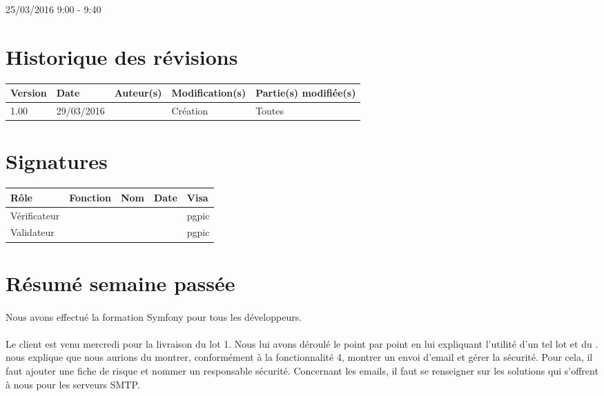\documentclass [a4paper] {article}
\begin{document}
25/03/2016			 				%
\hfill   
\hfill 	 9:00 - 9:40 				%


\section*{Historique des révisions}
\begin{center}
			\begin{tabular}{| p{2.5cm} | p{3cm} | p{3cm} | p{3cm} | p{3.5cm} |}
				\hline
				\rowcolor{Gray}
				Version & Date & Auteur(s) & Modification(s) & Partie(s) modifiée(s)		 \\
				\hline
				1.00 & 29/03/2016 & \Pierre & Création & Toutes \\
		\hline		
			\end{tabular}
		\end{center}

\section*{Signatures}

		\begin{center}
			\begin{tabular}{| p{2.5cm} | p{4cm} | p{3cm} | p{3cm} | p{2.5cm} |}
				\hline
				\rowcolor{Gray}
				Rôle & Fonction & Nom & Date & Visa		 \\
				\hline
				Vérificateur & \RQA & \Kafui &  & pgpic \\[30pt]
				\hline
				Validateur & \CP & \Sergi &  & pgpic \\[30pt]	
				\hline
			\end{tabular}
		\end{center}


\section{Résumé semaine passée}
\paragraph*{}
Nous avons effectué la formation Symfony pour tous les développeurs.

\paragraph*{}
Le client est venu mercredi pour la livraison du lot 1. Nous lui avons déroulé le \CDR{} point par point en lui expliquant l'utilité d'un tel lot et du \CDRCourt{}.\nomTuteurPedago{} nous explique que nous aurions du montrer, conformément à la fonctionnalité 4, montrer un envoi d'email et gérer la sécurité. Pour cela, il faut ajouter une fiche de risque et nommer un responsable sécurité. Concernant les emails, il faut se renseigner sur les solutions qui s'offrent à nous pour les serveurs SMTP.
\end{document}
